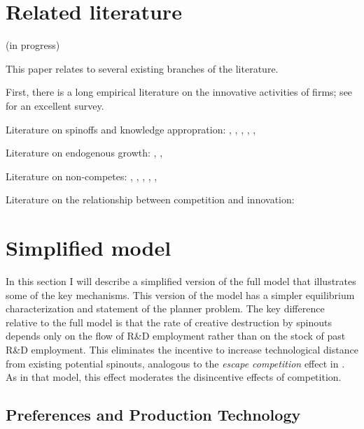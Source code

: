 \documentclass[12pt,english]{article}
\theoremstyle{remark}
\begin{document}
\section{Related literature}\label{related_literature}

(in progress)

This paper relates to several existing branches of the literature. 

First, there is a long empirical literature on the innovative activities of firms; see \cite{cohen_fifty_2010} for an excellent survey.

Literature on spinoffs and knowledge appropration: \cite{anton_expropriation_1994}, \cite{anton_start-ups_1995}, \cite{franco_covenants_2008}, \cite{klepper_entry_2005}, \cite{klette_innovating_2004}, \cite{chatterjee_spinoffs_2012}

Literature on endogenous growth: \cite{grossman_quality_1991}, \cite{romer_increasing_1986}, \cite{aghion_model_1992}

Literature on non-competes: \cite{saxenian_regional_1994}, \cite{gilson_legal_1999}, \cite{jeffers_impact_2018}, \cite{marx_mobility_2009}, \cite{marx_regional_2015}, \cite{starr_noncompetes_2019}

Literature on the relationship between competition and innovation: \cite{aghion_competition_2005}

\section{Simplified model}\label{simplified_model}

In this section I will describe a simplified version of the full model that illustrates some of the key mechanisms. This version of the model has a simpler equilibrium characterization and statement of the planner problem. The key difference relative to the full model is that the rate of creative destruction by spinouts depends only on the flow of R\&D employment rather than on the stock of past R\&D employment. This eliminates the incentive to increase technological distance from existing potential spinouts, analogous to the \textit{escape competition} effect in \cite{aghion_competition_2005}. As in that model, this effect moderates the disincentive effects of competition.

\subsection{Preferences and Production Technology}
\end{document}
